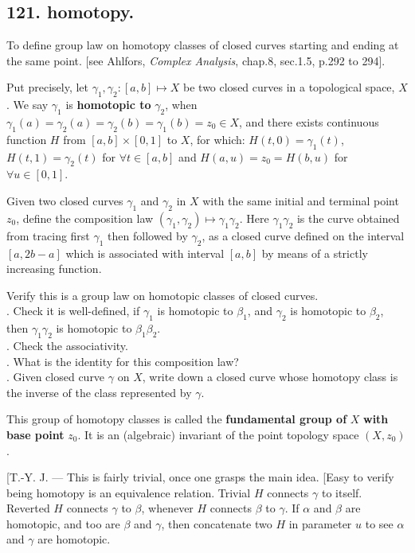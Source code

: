 \documentclass[12pt]{article}
\newcommand\aG\alpha \newcommand\bG\beta  \newcommand\gG\gamma \newcommand\dG\delta \newcommand\eG\varepsilon \newcommand\zG\zeta \newcommand\tG\theta \newcommand\kG\kappa \newcommand\lG\lambda \newcommand\sG\sigma \newcommand\fG\varphi \newcommand\oG\omega
\newcommand\Ev\forall%
\newcommand\Mp\mapsto%
\newcommand{\Ss}[1]{\textsf{\textbf{#1}}}%
\begin{document}
\subsection*{121. homotopy.} To define group law on homotopy classes of closed curves starting and ending at the same point. [see Ahlfors, \textit{Complex Analysis}, chap.8, sec.1.5, p.292 to 294]. \par
Put precisely, let \(\gG_1, \gG_2 : [a,b] \Mp X\) be two closed curves in a topological space, \(X\). 
We say \(\gG_1\) is \Ss{homotopic to} \(\gG_2\), when \(\gG_1(a) =\gG_2(a) =\gG_2(b) =\gG_1(b) =z_0\in X\), 
and there exists continuous function \(H\) from \([a, b]\times[0, 1]\) to \(X\), for which: \(H(t,0) =\gG_1(t)\), \(H(t,1) =\gG_2(t)\) for \(\Ev t\in [a,b]\) and \(H(a,u) =z_0 =H(b,u)\) for \(\Ev u \in [0,1]\). \par
Given two closed curves \(\gG_1\) and \(\gG_2\) in \(X\) with the same initial and terminal point \(z_0\), define the composition law \((\gG_1, \gG_2) \Mp \gG_1\gG_2\). 
Here \(\gG_1\gG_2\) is the curve obtained from tracing first \(\gG_1\) then followed by \(\gG_2\), as a closed curve defined on the interval \([a, 2b -a]\) which is associated with interval \([a, b]\) by means of a strictly increasing function. \par
Verify this is a group law on homotopic classes of closed curves. \\
. Check it is well-defined, if \(\gG_1\) is homotopic to \(\beta_1\), and \(\gG_2\) is homotopic to \(\bG_2\), then \(\gG_1 \gG_2\) is homotopic to \(\bG_1\bG_2\). \\
. Check the associativity. \\
. What is the identity for this composition law? \\
. Given closed curve \(\gG\) on \(X\), write down a closed curve whose homotopy class is the inverse of the class represented by \(\gG\). \par
This group of homotopy classes is called the \Ss{fundamental group of} \(X\) \Ss{with base point} \(z_0\). 
It is an (algebraic) invariant of the point topology space \((X, z_0)\). \par
\indent [T.-Y. J. --- This is fairly trivial, once one grasps the main idea. 
[Easy to verify being homotopy is an equivalence relation. 
Trivial \(H\) connects \(\gG\) to itself. 
Reverted \(H\) connects \(\gG\) to \(\bG\), whenever \(H\) connects \(\bG\) to \(\gG\). 
If \(\aG\) and \(\bG\) are homotopic, and too are \(\bG\) and \(\gG\), then concatenate two \(H\) in parameter \(u\) to see \(\aG\) and \(\gG\) are homotopic. \par
\end{document}
